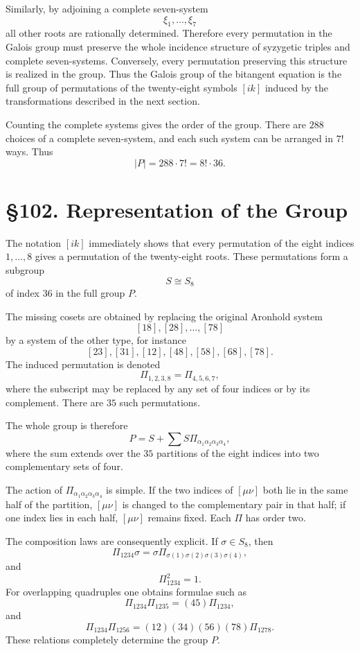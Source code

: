 \documentclass[11pt,a4paper]{book}
\newcommand{\webersection}[2]{\clearpage\section*{\S #1. #2}}
\begin{document}
Similarly, by adjoining a complete seven-system
\[
\xi_1,\ldots,\xi_7
\]
all other roots are rationally determined.  Therefore every permutation in the Galois group must preserve the whole incidence structure of syzygetic triples and complete seven-systems.  Conversely, every permutation preserving this structure is realized in the group.  Thus the Galois group of the bitangent equation is the full group of permutations of the twenty-eight symbols \([ik]\) induced by the transformations described in the next section.

Counting the complete systems gives the order of the group.  There are \(288\) choices of a complete seven-system, and each such system can be arranged in \(7!\) ways.  Thus
\[
|P|=288\cdot7!
   =8!\cdot36.
\]

\webersection{102}{Representation of the Group}

The notation \([ik]\) immediately shows that every permutation of the eight indices \(1,\dots,8\) gives a permutation of the twenty-eight roots.  These permutations form a subgroup
\[
S\cong S_8
\]
of index \(36\) in the full group \(P\).

The missing cosets are obtained by replacing the original Aronhold system
\[
[18],[28],\ldots,[78]
\]
by a system of the other type, for instance
\[
[23],[31],[12],[48],[58],[68],[78].
\]
The induced permutation is denoted
\[
\Pi_{1,2,3,8}=\Pi_{4,5,6,7},
\]
where the subscript may be replaced by any set of four indices or by its complement.  There are \(35\) such permutations.

The whole group is therefore
\[
P=S+\sum S\Pi_{\alpha_1\alpha_2\alpha_3\alpha_4},
\]
where the sum extends over the \(35\) partitions of the eight indices into two complementary sets of four.

The action of \(\Pi_{\alpha_1\alpha_2\alpha_3\alpha_4}\) is simple.  If the two indices of \([\mu\nu]\) both lie in the same half of the partition, \([\mu\nu]\) is changed to the complementary pair in that half; if one index lies in each half, \([\mu\nu]\) remains fixed.  Each \(\Pi\) has order two.

The composition laws are consequently explicit.  If \(\sigma\in S_8\), then
\[
\Pi_{1234}\sigma=\sigma\Pi_{\sigma(1)\sigma(2)\sigma(3)\sigma(4)},
\]
and
\[
\Pi_{1234}^2=1.
\]
For overlapping quadruples one obtains formulae such as
\[
\Pi_{1234}\Pi_{1235}=(45)\Pi_{1234},
\]
and
\[
\Pi_{1234}\Pi_{1256}
=(12)(34)(56)(78)\Pi_{1278}.
\]
These relations completely determine the group \(P\).
\end{document}
